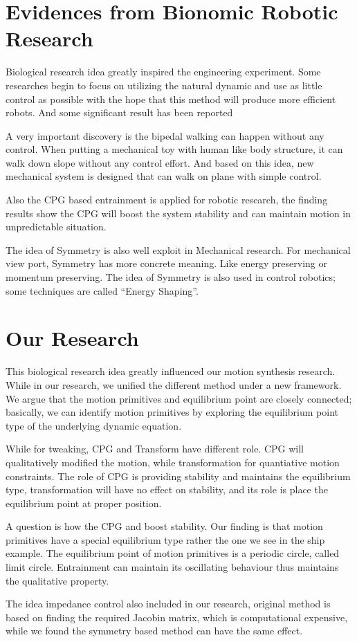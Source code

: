\section{ Evidences from Bionomic Robotic Research}
Biological research idea greatly inspired the engineering experiment.
Some researches begin to focus on utilizing the natural dynamic and use as little control as possible with the hope that this method will produce more efficient robots. 
And some significant result has been reported
\begin{itemize}
A very important discovery is the bipedal walking can happen without any control\citep{McGeer1990}. 
When putting a mechanical toy with human like body structure, it can walk down slope without any control effort. 
And based on this idea, new mechanical system is designed that can walk on plane with simple control\citep{Collins2005}.

Also the CPG based entrainment is applied for robotic research\citep{Williamson1999a}, the finding results show the CPG will boost the system stability and can maintain motion in unpredictable situation.

The idea of Symmetry is also well exploit in Mechanical research.
For mechanical view port, Symmetry has more concrete meaning.
Like energy preserving or momentum preserving.
The idea of Symmetry is also used in control robotics\citep{spong2005controlled}; some techniques are called “Energy Shaping”.
\end{itemize}

\section{Our Research}
This biological research idea greatly influenced our motion synthesis research.
While in our research, we unified the different method under a new framework.
We argue that the motion primitives and equilibrium point are closely connected; basically, we can identify motion primitives by exploring the equilibrium point type of the underlying dynamic equation. 

While for tweaking, CPG and Transform have different role. 
CPG will qualitatively modified the motion, while transformation for quantiative motion constraints.
The role of CPG is providing stability and maintains the equilibrium type, transformation will have no effect on stability, and its role is place the equilibrium point at proper position.

A question is how the CPG and boost stability. 
Our finding is that motion primitives have a special equilibrium type rather the one we see in the ship example.
The equilibrium point of motion primitives is a periodic circle, called limit circle. 
Entrainment can maintain its oscillating behaviour thus maintains the qualitative property.

The idea impedance control also included in our research, original method is based on finding the required Jacobin matrix, which is computational expensive, while we found the symmetry based method can have the same effect.

